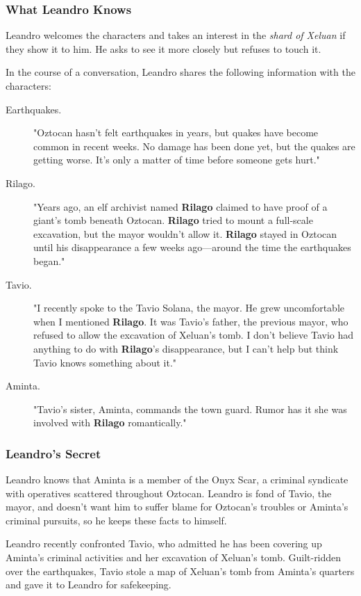 \documentclass[10pt,a4paper,twoside,bg=print,twocolumn,openany,nodeprecatedcode]{dndbook}
\begin{document}
\subsubsection{What Leandro Knows}
Leandro welcomes the characters and takes an interest in the \textit{shard of Xeluan} if they show it to him. He asks to see it more closely but refuses to touch it.

In the course of a conversation, Leandro shares the following information with the characters:


\begin{description}
\item[Earthquakes.]
"Oztocan hasn't felt earthquakes in years, but quakes have become common in recent weeks. No damage has been done yet, but the quakes are getting worse. It's only a matter of time before someone gets hurt."
\item[Rilago.]
"Years ago, an elf archivist named \textbf{Rilago} claimed to have proof of a giant's tomb beneath Oztocan. \textbf{Rilago} tried to mount a full-scale excavation, but the mayor wouldn't allow it. \textbf{Rilago} stayed in Oztocan until his disappearance a few weeks ago—around the time the earthquakes began."
\item[Tavio.]
"I recently spoke to the Tavio Solana, the mayor. He grew uncomfortable when I mentioned \textbf{Rilago}. It was Tavio's father, the previous mayor, who refused to allow the excavation of Xeluan's tomb. I don't believe Tavio had anything to do with \textbf{Rilago}'s disappearance, but I can't help but think Tavio knows something about it."
\item[Aminta.]
"Tavio's sister, Aminta, commands the town guard. Rumor has it she was involved with \textbf{Rilago} romantically."
\end{description}

\subsubsection{Leandro's Secret}
Leandro knows that Aminta is a member of the Onyx Scar, a criminal syndicate with operatives scattered throughout Oztocan. Leandro is fond of Tavio, the mayor, and doesn't want him to suffer blame for Oztocan's troubles or Aminta's criminal pursuits, so he keeps these facts to himself.

Leandro recently confronted Tavio, who admitted he has been covering up Aminta's criminal activities and her excavation of Xeluan's tomb. Guilt-ridden over the earthquakes, Tavio stole a map of Xeluan's tomb from Aminta's quarters and gave it to Leandro for safekeeping.
\end{document}
